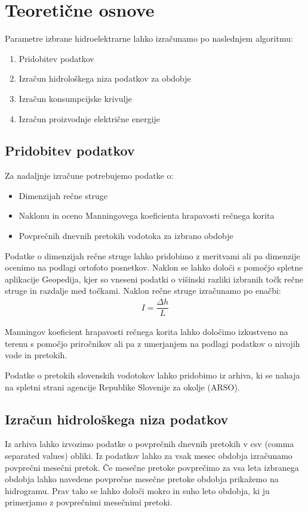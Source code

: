 \chapter{Teoretične osnove}

Parametre izbrane hidroelektrarne lahko izračunamo po naslednjem algoritmu:
\begin{enumerate}[noitemsep, topsep=0pt]
	\item Pridobitev podatkov
	\item Izračun hidrološkega niza podatkov za obdobje
	\item Izračun konsumpcijske krivulje
	\item Izračun proizvodnje električne energije
\end{enumerate}


\section{Pridobitev podatkov}
Za nadaljnje izračune potrebujemo podatke o:
\begin{itemize}[noitemsep, topsep=0pt]
	\item Dimenzijah rečne struge
	\item Naklonu in oceno Manningovega koeficienta hrapavosti rečnega korita
	\item Povprečnih dnevnih pretokih vodotoka za izbrano obdobje
\end{itemize}

Podatke o dimenzijah rečne struge lahko pridobimo z meritvami ali pa dimenzije ocenimo na podlagi ortofoto posnetkov. Naklon se lahko določi s pomočjo spletne aplikacije Geopedija, kjer so vneseni podatki o višinski razliki izbranih točk rečne struge in razdalje med točkami. Naklon rečne struge izračunamo po enačbi:
\begin{align}
 I = \dfrac{\Delta h}{L}
\end{align}

 Manningov koeficient hrapavosti rečnega korita lahko določimo izkustveno na terenu s pomočjo priročnikov ali pa z umerjanjem na podlagi podatkov o nivojih vode in pretokih.
 
 
  Podatke o pretokih slovenskih vodotokov lahko pridobimo iz arhiva, ki se nahaja na spletni strani agencije Republike Slovenije za okolje (ARSO).




\section{Izračun hidrološkega niza podatkov}
Iz arhiva lahko izvozimo podatke o povprečnih dnevnih pretokih v csv (comma separated values) obliki. Iz podatkov lahko za vsak mesec obdobja izračunamo povprečni mesečni pretok. Če mesečne pretoke povprečimo za vsa leta izbranega obdobja lahko navedene povprečne mesečne pretoke obdobja prikažemo na hidrogramu. Prav tako se lahko določi mokro in suho leto obdobja, ki ju primerjamo z povprečnimi mesečnimi pretoki.



